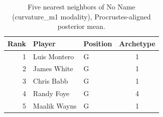 \begin{table}[htbp]
  \centering\small
  \begin{tabular}{rllc}
    \toprule
    Rank & Player & Position & Archetype \\
    \midrule
    1 & Luis Montero & G & 1 \\
    2 & James White & G & 1 \\
    3 & Chris Babb & G & 1 \\
    4 & Randy Foye & G & 4 \\
    5 & Maalik Wayns & G & 1 \\
    \bottomrule
  \end{tabular}
  \caption{Five nearest neighbors of No Name (curvature_m1 modality), Procrustes-aligned posterior mean.}
  \label{tab:No_Name_neighbors_curvature_m1}
\end{table}

